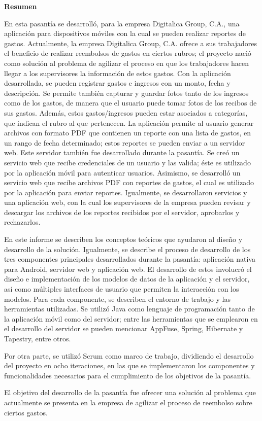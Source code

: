 \setcounter{page}{3}
\begin{center}
	{\bf Resumen}  %
\end{center}	

En esta pasantía se desarrolló, para la empresa Digitalica Group, C.A., una aplicación para dispositivos móviles con la cual se pueden realizar reportes de gastos. Actualmente, la empresa Digitalica Group, C.A. ofrece a sus trabajadores el beneficio de realizar reembolsos de gastos en ciertos rubros; el proyecto nació como solución al problema de agilizar el proceso en que los trabajadores hacen llegar a los supervisores la información de estos gastos. Con la aplicación desarrollada, se pueden registrar gastos e ingresos con un monto, fecha y descripción. Se permite también capturar y guardar fotos tanto de los ingresos como de los gastos, de manera que el usuario puede tomar fotos de los recibos de sus gastos. Además, estos gastos/ingresos pueden estar asociados a categorías, que indican el rubro al que pertenecen. La aplicación permite al usuario generar archivos con formato PDF que contienen un reporte con una lista de gastos, en un rango de fecha determinado; estos reportes se pueden enviar a un servidor web. Este servidor también fue desarrollado durante la pasantía. Se creó un servicio web que recibe credenciales de un usuario y las valida; éste es utilizado por la aplicación móvil para autenticar usuarios. Asimismo, se desarrolló un servicio web que recibe archivos PDF con reportes de gastos, el cual es utilizado por la aplicación para enviar reportes. Igualmente, se desarrollaron servicios y una aplicación web, con la cual los supervisores de la empresa pueden revisar y descargar los archivos de los reportes recibidos por el servidor, aprobarlos y rechazarlos.

En este informe se describen los conceptos teóricos que ayudaron al diseño y desarrollo de la solución. Igualmente, se describe el proceso de desarrollo de los tres componentes principales desarrollados durante la pasantía: aplicación nativa para Android, servidor web y aplicación web. El desarrollo de estos involucró el diseño e implementación de los modelos de datos de la aplicación y el servidor, así como múltiples interfaces de usuario que permiten la interacción con los modelos. Para cada componente, se describen el entorno de trabajo y las herramientas utilizadas. Se utilizó Java como lenguaje de programación tanto de la aplicación móvil como del servidor; entre las herramientas que se emplearon en el desarrollo del servidor se pueden mencionar AppFuse, Spring, Hibernate y Tapestry, entre otros.

Por otra parte, se utilizó Scrum como marco de trabajo, dividiendo el desarrollo del proyecto en ocho iteraciones, en las que se implementaron los componentes y funcionalidades necesarios para el cumplimiento de los objetivos de la pasantía.

El objetivo del desarrollo de la pasantía fue ofrecer una solución al problema que actualmente se presenta en la empresa de agilizar el proceso de reembolso sobre ciertos gastos.


